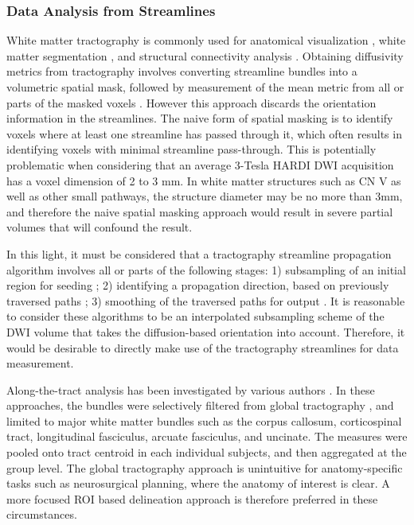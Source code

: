 \subsubsection{Data Analysis from Streamlines}
White matter tractography is commonly used for anatomical visualization \cite{Chen2011b}, white matter segmentation \cite{Behrens2003a,Johansen-Berg2005}, and structural connectivity analysis \cite{Cao2013,Wiech2014}. Obtaining diffusivity metrics from tractography involves converting streamline bundles into a volumetric spatial mask, followed by measurement of the mean metric from all or parts of the masked voxels \cite{Concha2005,Fitzsimmons2009}. However this approach discards the orientation information in the streamlines. The naive form of spatial masking is to identify voxels where at least one streamline has passed through it, which often results in identifying voxels with minimal streamline pass-through. This is potentially problematic when considering that an average 3-Tesla HARDI DWI acquisition has a voxel dimension of 2 to 3 mm. In white matter structures such as CN V as well as other small pathways, the structure diameter may be no more than 3mm, and therefore the naive spatial masking approach would result in severe partial volumes that will confound the result. 

In this light, it must be considered that a tractography streamline propagation algorithm involves all or parts of the following stages: 1) subsampling of an initial region for seeding \cite{Basser2002,Cote2012}; 2) identifying a propagation direction, based on previously traversed paths \cite{Malcolm2010,Qazi2009,Tournier2010}; 3) smoothing of the traversed paths for output \cite{Tuch2000d}. It is reasonable to consider these algorithms to be an interpolated subsampling scheme of the DWI volume that takes the diffusion-based orientation into account. Therefore, it would be desirable to directly make use of the tractography streamlines for data measurement. 

Along-the-tract analysis has been investigated by various authors \cite{Colby2012,ODonnell2009,Wang2015,Yeatman2012}. In these approaches, the bundles were selectively filtered from global tractography \cite{Wang2015,Yeatman2012}, and limited to major white matter bundles such as the corpus callosum, corticospinal tract, longitudinal fasciculus, arcuate fasciculus, and uncinate. The measures were pooled onto tract centroid in each individual subjects, and then aggregated at the group level. The global tractography approach is unintuitive for anatomy-specific tasks such as neurosurgical planning, where the anatomy of interest is clear. A more focused ROI based delineation approach is therefore preferred in these circumstances.

